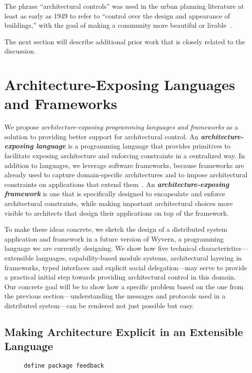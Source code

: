 \documentclass[runningheads]{llncs}
\begin{document}
\begin{sloppypar}
The phrase ``architectural controls'' was used in the urban planning
literature at least as early as 1949 to refer to ``control over the
design and appearance of buildings,'' with the goal of making a
community more beautiful or livable~\cite{arch-controls}.

The next section will describe additional prior work that is closely related to the discussion.

\section{Architecture-Exposing Languages and Frameworks}

We propose \emph{architecture-exposing programming languages and frameworks} as a solution to providing better support for architectural control.  An \emph\textbf{architecture-exposing language} is a programming language that provides primitives to facilitate exposing architecture and enforcing constraints in a centralized way.  In addition to languages, we leverage software frameworks, because frameworks are already used to capture domain-specific architectures and to impose architectural constraints on applications that extend them~\cite{JaspanThesis}.  An \emph\textbf{architecture-exposing framework} is one that is specifically designed to encapsulate and enforce architectural constraints, while making important architectural choices more visible to architects that design their applications on top of the framework.

To make these ideas concrete, we sketch the design of a distributed system application and framework in a future version of Wyvern, a programming language we are currently designing.  We show how five technical characteristics---extensible languages, capability-based module systems, architectural layering in frameworks, typed interfaces and explicit social delegation---may serve to provide a practical initial step towards providing architectural control in this domain.  Our concrete goal will be to show how a specific problem based on the one from the previous section---understanding the messages and protocols used in a distributed system---can be rendered not just possible but easy.


\subsection{Making Architecture Explicit in an Extensible Language}

   
\begin{figure}[t]
\begin{lstlisting}
define package feedback


\end{lstlisting}
\end{figure}
\end{sloppypar}
\end{document}
